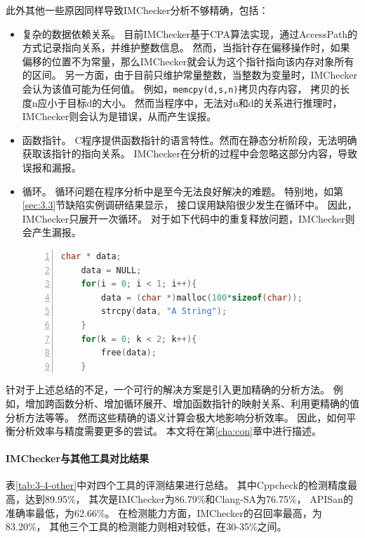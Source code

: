 此外其他一些原因同样导致IMChecker分析不够精确，包括：
\begin{itemize}
	\item 复杂的数据依赖关系。
	目前IMChecker基于CPA算法实现，通过AccessPath的方式记录指向关系，并维护整数信息。
	然而，当指针存在偏移操作时，如果偏移的位置不为常量，那么IMChecker就会认为这个指针指向该内存对象所有的区间。
	另一方面，由于目前只维护常量整数，当整数为变量时，IMChecker会认为该值可能为任何值。
	例如，\texttt{memcpy(d,s,n)}拷贝内存内容，
	拷贝的长度n应小于目标d的大小。
	然而当程序中，无法对n和d的关系进行推理时，IMChecker则会认为是错误，从而产生误报。
	\item 函数指针。
	C程序提供函数指针的语言特性。然而在静态分析阶段，无法明确获取该指针的指向关系。
	IMChecker在分析的过程中会忽略这部分内容，导致误报和漏报。
	\item 循环。
	循环问题在程序分析中是至今无法良好解决的难题。
	特别地，如第\ref{sec:3.3}节缺陷实例调研结果显示，
	接口误用缺陷很少发生在循环中。
	因此，IMChecker只展开一次循环。
	对于如下代码中的重复释放问题，IMChecker则会产生漏报。
\begin{lstlisting}[language={C},
basicstyle=\linespread{0.7}\listingsfont,
numbers=left,
xleftmargin=.2\textwidth]
	char * data;
	data = NULL;
	for(i = 0; i < 1; i++){
		data = (char *)malloc(100*sizeof(char));
		strcpy(data, "A String");
	}
	for(k = 0; k < 2; k++){
		free(data);
	}
\end{lstlisting}	
\end{itemize}

针对于上述总结的不足，一个可行的解决方案是引入更加精确的分析方法。
例如，增加跨函数分析、增加循环展开、增加函数指针的映射关系、利用更精确的值分析方法等等。
然而这些精确的语义计算会极大地影响分析效率。
因此，如何平衡分析效率与精度需要更多的尝试。
本文将在第\ref{cha:con}章中进行描述。

\paragraph{IMChecker与其他工具对比结果}



表\ref{tab:3-4-other}中对四个工具的评测结果进行总结。
其中Cppcheck的检测精度最高，达到89.95\%，
其次是IMChecker为86.79\%和Clang-SA为76.75\%，
APISan的准确率最低，为62.66\%。
在检测能力方面，IMChecker的召回率最高，为83.20\%，
其他三个工具的检测能力则相对较低，在30-35\%之间。

